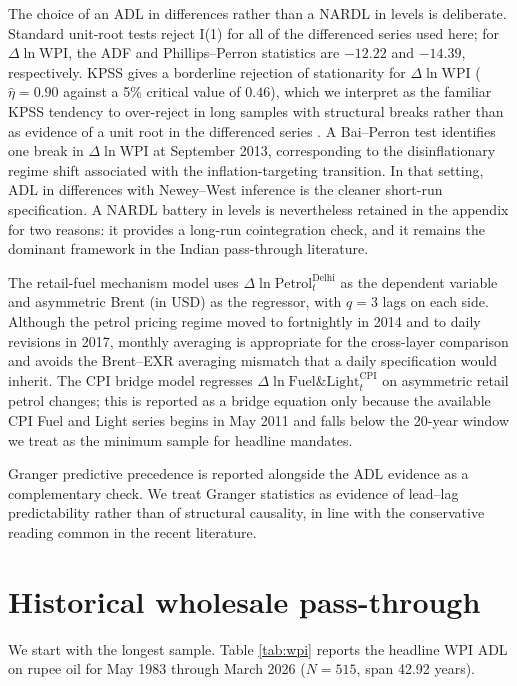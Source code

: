 \documentclass[11pt,a4paper]{article}
\begin{document}
The choice of an ADL in differences rather than a NARDL in levels is deliberate. Standard unit-root tests reject I(1) for all of the differenced series used here; for $\Delta \ln \mathrm{WPI}$, the ADF and Phillips--Perron statistics are $-12.22$ and $-14.39$, respectively. KPSS gives a borderline rejection of stationarity for $\Delta \ln \mathrm{WPI}$ ($\hat\eta = 0.90$ against a 5\% critical value of $0.46$), which we interpret as the familiar KPSS tendency to over-reject in long samples with structural breaks rather than as evidence of a unit root in the differenced series \citep[see][]{rbi2014}. A Bai--Perron test identifies one break in $\Delta \ln \mathrm{WPI}$ at September 2013, corresponding to the disinflationary regime shift associated with the inflation-targeting transition. In that setting, ADL in differences with Newey--West inference is the cleaner short-run specification. A NARDL battery in levels is nevertheless retained in the appendix for two reasons: it provides a long-run cointegration check, and it remains the dominant framework in the Indian pass-through literature.

The retail-fuel mechanism model uses $\Delta \ln \mathrm{Petrol}_t^{\mathrm{Delhi}}$ as the dependent variable and asymmetric Brent (in USD) as the regressor, with $q = 3$ lags on each side. Although the petrol pricing regime moved to fortnightly in 2014 and to daily revisions in 2017, monthly averaging is appropriate for the cross-layer comparison and avoids the Brent--EXR averaging mismatch that a daily specification would inherit. The CPI bridge model regresses $\Delta \ln \mathrm{Fuel\&Light}^{\mathrm{CPI}}_t$ on asymmetric retail petrol changes; this is reported as a bridge equation only because the available CPI Fuel and Light series begins in May 2011 and falls below the 20-year window we treat as the minimum sample for headline mandates.

Granger predictive precedence is reported alongside the ADL evidence as a complementary check. We treat Granger statistics as evidence of lead--lag predictability rather than of structural causality, in line with the conservative reading common in the recent literature.

\section{Historical wholesale pass-through}
\label{sec:wpi}

We start with the longest sample. Table \ref{tab:wpi} reports the headline WPI ADL on rupee oil for May 1983 through March 2026 ($N=515$, span 42.92 years).
\end{document}
